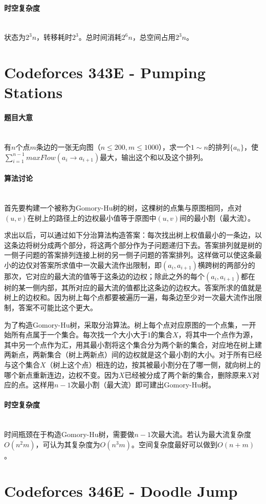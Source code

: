 \documentclass[UTF8]{ctexart}
\newcommand{\myparagraph}[1]{\paragraph{#1}\mbox{}\\}
\theoremstyle{nonumberplain}
\begin{document}
		
		\myparagraph{时空复杂度}
		
			状态为$2^3n$，转移耗时$2^3$。总时间消耗$2^6n$，总空间占用$2^3n$。
	
	\section{Codeforces 343E - Pumping Stations}
	
		\myparagraph{题目大意}
		
			有$n$个点$m$条边的一张无向图（$n \leq 200, m \leq 1000$），求一个$1 \sim n$的排列$\{a_n\}$，使\\$\sum_{i=1}^{n-1}maxFlow(a_i \to a_{i+1})$最大，输出这个和以及这个排列。
		
		\myparagraph{算法讨论}
		
			首先要构建一个被称为Gomory-Hu树的树，这棵树的点集与原图相同，点对$(u,v)$在树上的路径上的边权最小值等于原图中$(u,v)$间的最小割（最大流）。
			
			求出以后，可以通过如下分治算法构造答案：每次找出树上权值最小的一条边，以这条边将树分成两个部分，将这两个部分作为子问题递归下去。答案排列就是树的一侧子问题的答案排列连接上树的另一侧子问题的答案排列。这样做可以使这条最小的边仅对答案所求值中一次最大流作出限制，即$(a_i,a_{i+1})$横跨树的两部分的那次，它对应的最大流的值等于这条边的边权；除此之外的每个$(a_i,a_{i+1})$都在树的某一侧内部，其所对应的最大流的值都比这条边的边权大。答案所求的值就是树上的边权和。因为树上每个点都要被遍历一遍，每条边至少对一次最大流作出限制，答案不可能比这个更大。
			
			为了构造Gomory-Hu树，采取分治算法。树上每个点对应原图的一个点集，一开始所有点属于一个集合。每次找一个大小大于1的集合$X$，将其中一个点作为源，其中另一个点作为汇，用其最小割将这个集合分为两个新的集合，对应地在树上建两新点，两新集合（树上两新点）间的边权就是这个最小割的大小。对于所有已经与这个集合$X$（树上这个点）相连的边，按其被最小割分在了哪一侧，就向树上的哪个新点重新连边，边权不变。因为$X$已经被分成了两个新的集合，删除原来$X$对应的点。这样用$n-1$次最小割（最大流）即可建出Gomory-Hu树。
		
		\myparagraph{时空复杂度}
		
			时间瓶颈在于构造Gomory-Hu树，需要做$n-1$次最大流。若认为最大流复杂度$O(n^2m)$，可认为其复杂度为$O(n^3m)$。空间复杂度最好可以做到$O(n+m)$。
	
	\section{Codeforces 346E - Doodle Jump}
		
\end{document}
